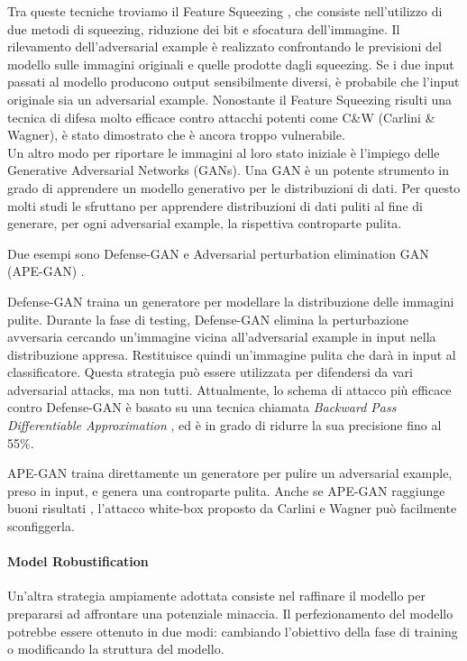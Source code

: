Tra queste tecniche troviamo il Feature Squeezing \cite{xu2017feature}, che consiste nell'utilizzo di due metodi di squeezing, riduzione dei bit e sfocatura dell'immagine. 
Il rilevamento dell'adversarial example è realizzato confrontando le previsioni del modello sulle immagini originali e quelle prodotte dagli squeezing. Se i due input passati al modello producono output sensibilmente diversi, è probabile che l'input originale sia un adversarial example. Nonostante il Feature Squeezing risulti una tecnica di difesa molto efficace contro attacchi potenti come C\&W (Carlini \& Wagner), è stato dimostrato \cite{he2017adversarial, sharma2018bypassing} che è ancora troppo vulnerabile.
\\

Un altro modo per riportare le immagini al loro stato iniziale è l'impiego delle Generative Adversarial Networks (GANs).
Una GAN è un potente strumento in grado di apprendere un modello generativo per le distribuzioni di dati. Per questo molti studi le sfruttano per apprendere distribuzioni di dati puliti al fine di generare, per ogni adversarial example, la rispettiva controparte pulita. 

Due esempi sono Defense-GAN \cite{samangouei2018defense} e Adversarial perturbation elimination GAN (APE-GAN) \cite{shen2017ape}. 

Defense-GAN traina un generatore per modellare la distribuzione delle immagini pulite. Durante la fase di testing, Defense-GAN elimina la perturbazione avversaria cercando un'immagine vicina all'adversarial example in input nella distribuzione appresa. Restituisce quindi un'immagine pulita che darà in input al classificatore.
Questa strategia può essere utilizzata per difendersi da vari adversarial attacks, ma non tutti. Attualmente, lo schema di attacco più efficace contro Defense-GAN è basato su una tecnica chiamata \textit{Backward
Pass Differentiable Approximation} \cite{athalye2018obfuscated}, ed è in grado di ridurre la sua precisione fino al 55\%. 

APE-GAN traina direttamente un generatore per pulire un adversarial example, preso in input, e genera una controparte pulita. Anche se APE-GAN raggiunge buoni risultati \cite{shen2017ape}, l'attacco white-box proposto da Carlini e Wagner \cite{carlini2017magnet} può facilmente sconfiggerla. 

\paragraph{Model Robustification}
Un'altra strategia ampiamente adottata consiste nel raffinare il modello per prepararsi ad affrontare una potenziale minaccia.
Il perfezionamento del modello potrebbe essere ottenuto in due modi: cambiando l'obiettivo della fase di training o modificando la struttura del modello.
\\

